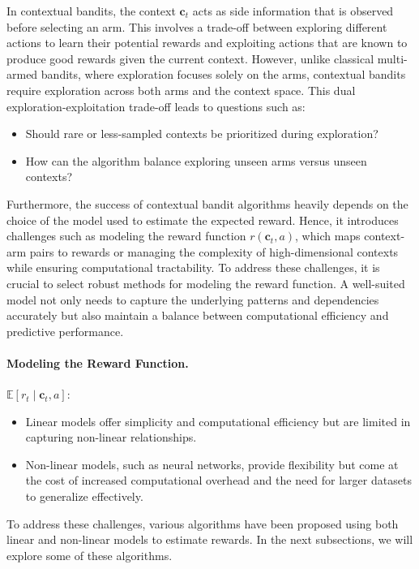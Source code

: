 In contextual bandits, the context $\mathbf{c}_t$ acts as side information that is observed before selecting an arm. This involves a trade-off between exploring different actions to learn their potential rewards and exploiting actions that are known to produce good rewards given the current context. However, unlike classical multi-armed bandits, where exploration focuses solely on the arms, contextual bandits require exploration across both arms and the context space. This dual exploration-exploitation trade-off leads to questions such as:
\begin{itemize}
    \item Should rare or less-sampled contexts be prioritized during exploration?
    \item How can the algorithm balance exploring unseen arms versus unseen contexts?
\end{itemize}
Furthermore, the success of contextual bandit algorithms heavily depends on the choice of the model used to estimate the expected reward. Hence, it introduces challenges such as modeling the reward function $r(\mathbf{c}_t, a)$, which maps context-arm pairs to rewards or managing the complexity of high-dimensional contexts while ensuring computational tractability. To address these challenges, it is crucial to select robust methods for modeling the reward function. A well-suited model not only needs to capture the underlying patterns and dependencies accurately but also maintain a balance between computational efficiency and predictive performance.

\paragraph{Modeling the Reward Function.} 
$\mathbb{E}[r_t \mid \mathbf{c}_t, a]$:
\begin{itemize}
    \item Linear models offer simplicity and computational efficiency but are limited in capturing non-linear relationships.
    \item Non-linear models, such as neural networks, provide flexibility but come at the cost of increased computational overhead and the need for larger datasets to generalize effectively.
\end{itemize}


To address these challenges, various algorithms have been proposed using both linear and non-linear models to estimate rewards. In the next subsections, we will explore some of these algorithms.

